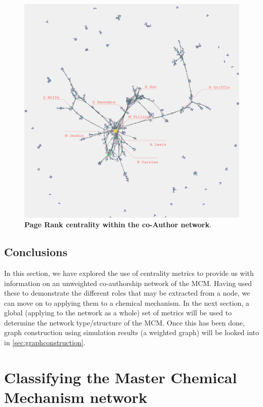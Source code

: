 \begin{figure}[H]
     \centering
         \includegraphics[width=.8\textwidth]{figures_c3/pagerankauthor.png}

        
                \caption{ \textbf{Page Rank centrality within the co-Author network}.}
        \label{fig:pagerankauth}
\end{figure}


\subsection{Conclusions}
In this section, we have explored the use of centrality metrics to provide us with information on an unweighted co-authorship network of the MCM. Having used these to demonstrate the different roles that may be extracted from a node, we can move on to applying them to a chemical mechanism. In the next section, a global (applying to the network as a whole) set of metrics will be used to determine the network type/structure of the MCM. Once this has been done, graph construction using simulation results (a weighted graph) will be looked into in \autoref{sec:graphconstruction}. 
% 
% 
% 
% 


\section{Classifying the Master Chemical Mechanism network}\label{sec:globalclass}

